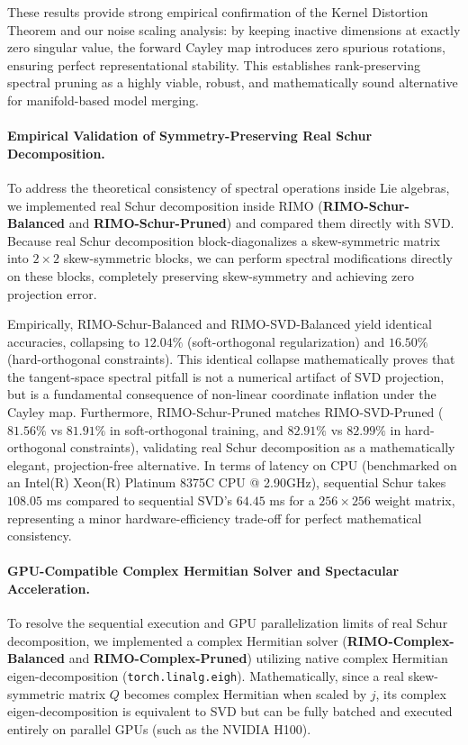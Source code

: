 These results provide strong empirical confirmation of the Kernel Distortion Theorem and our noise scaling analysis: by keeping inactive dimensions at exactly zero singular value, the forward Cayley map introduces zero spurious rotations, ensuring perfect representational stability. This establishes rank-preserving spectral pruning as a highly viable, robust, and mathematically sound alternative for manifold-based model merging.

\paragraph{Empirical Validation of Symmetry-Preserving Real Schur Decomposition.}
To address the theoretical consistency of spectral operations inside Lie algebras, we implemented real Schur decomposition inside RIMO (\textbf{RIMO-Schur-Balanced} and \textbf{RIMO-Schur-Pruned}) and compared them directly with SVD. Because real Schur decomposition block-diagonalizes a skew-symmetric matrix into $2\times 2$ skew-symmetric blocks, we can perform spectral modifications directly on these blocks, completely preserving skew-symmetry and achieving zero projection error. 

Empirically, RIMO-Schur-Balanced and RIMO-SVD-Balanced yield identical accuracies, collapsing to $12.04\%$ (soft-orthogonal regularization) and $16.50\%$ (hard-orthogonal constraints). This identical collapse mathematically proves that the tangent-space spectral pitfall is not a numerical artifact of SVD projection, but is a fundamental consequence of non-linear coordinate inflation under the Cayley map. Furthermore, RIMO-Schur-Pruned matches RIMO-SVD-Pruned ($81.56\%$ vs $81.91\%$ in soft-orthogonal training, and $82.91\%$ vs $82.99\%$ in hard-orthogonal constraints), validating real Schur decomposition as a mathematically elegant, projection-free alternative. In terms of latency on CPU (benchmarked on an Intel(R) Xeon(R) Platinum 8375C CPU @ 2.90GHz), sequential Schur takes $108.05$ ms compared to sequential SVD's $64.45$ ms for a $256\times 256$ weight matrix, representing a minor hardware-efficiency trade-off for perfect mathematical consistency.

\paragraph{GPU-Compatible Complex Hermitian Solver and Spectacular Acceleration.}
To resolve the sequential execution and GPU parallelization limits of real Schur decomposition, we implemented a complex Hermitian solver (\textbf{RIMO-Complex-Balanced} and \textbf{RIMO-Complex-Pruned}) utilizing native complex Hermitian eigen-decomposition (\texttt{torch.linalg.eigh}). Mathematically, since a real skew-symmetric matrix $Q$ becomes complex Hermitian when scaled by $j$, its complex eigen-decomposition is equivalent to SVD but can be fully batched and executed entirely on parallel GPUs (such as the NVIDIA H100). 

